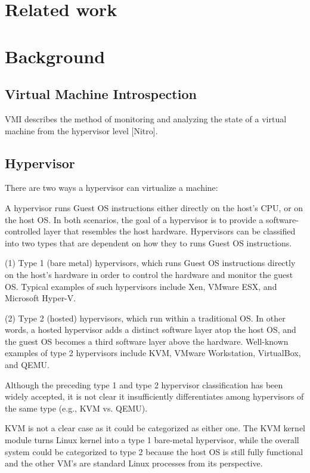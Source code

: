 \documentclass{report}
\begin{document}
\begin{spacing}{1.5}
\chapter{Related work}
\chapter{Background}
\section{Virtual Machine Introspection}

VMI describes the method of monitoring and analyzing the state of a virtual machine from the hypervisor level [Nitro]. 


\section{Hypervisor}

{\large
There are two ways a hypervisor can virtualize a machine:

A hypervisor runs Guest OS instructions either directly on the host's CPU, or on the host OS. In both scenarios, 
the goal of a hypervisor is to provide a software-controlled layer that resembles the host hardware. Hypervisors 
can be classified into two types that are dependent on how they to runs Guest OS instructions.
\newline
}

{\large 
(1) Type 1 (bare metal) hypervisors, which runs Guest OS instructions directly on the host’s hardware in order to control
the hardware and monitor the guest OS. Typical examples of such hypervisors include Xen, VMware ESX, and Microsoft Hyper-V.
\newline
}

{\large
(2) Type 2 (hosted) hypervisors, which run within a traditional OS. In other words, a
hosted hypervisor adds a distinct software layer atop the host OS, and the guest OS becomes a third
software layer above the hardware. Well-known examples of type 2 hypervisors include KVM, 
VMware Workstation, VirtualBox, and QEMU.
\newline
}

{\large
Although the preceding type 1 and type 2 hypervisor classification has been widely
accepted, it is not clear it insufficiently differentiates among hypervisors of the same type (e.g., KVM vs. QEMU).


KVM is not a clear case as it could be categorized as either one. The KVM kernel module turns Linux kernel into a type 1 bare-metal hypervisor, while the overall system could be categorized to type 2 because the host OS is still fully functional and the other VM's are standard Linux processes from its perspective.


}
\end{spacing}
\end{document}
